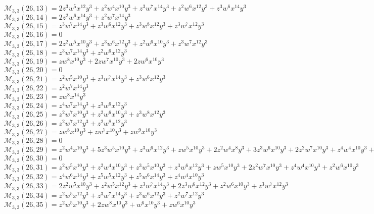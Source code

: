 $\mathcal{M}_{3,3}(26,13)=2z^3w^5x^{12}y^3+z^2w^4x^{10}y^3+z^3w^7x^{14}y^3+z^2w^6x^{12}y^3+z^3w^6x^{14}y^3$\\
$\mathcal{M}_{3,3}(26,14)=2z^2w^6x^{14}y^3+z^2w^7x^{14}y^3$\\
$\mathcal{M}_{3,3}(26,15)=z^3w^7x^{14}y^3+z^3w^6x^{12}y^3+z^3w^8x^{12}y^3+z^3w^7x^{12}y^3$\\
$\mathcal{M}_{3,3}(26,16)=0$\\
$\mathcal{M}_{3,3}(26,17)=2z^2w^5x^{10}y^3+z^3w^6x^{12}y^3+z^2w^6x^{10}y^3+z^3w^7x^{12}y^3$\\
$\mathcal{M}_{3,3}(26,18)=z^3w^7x^{14}y^3+z^2w^6x^{12}y^3$\\
$\mathcal{M}_{3,3}(26,19)=zw^8x^{10}y^3+2zw^7x^{10}y^3+2zw^6x^{10}y^3$\\
$\mathcal{M}_{3,3}(26,20)=0$\\
$\mathcal{M}_{3,3}(26,21)=z^2w^5x^{10}y^3+z^3w^7x^{14}y^3+z^3w^6x^{12}y^3$\\
$\mathcal{M}_{3,3}(26,22)=z^2w^7x^{14}y^3$\\
$\mathcal{M}_{3,3}(26,23)=zw^8x^{14}y^3$\\
$\mathcal{M}_{3,3}(26,24)=z^4w^7x^{14}y^3+z^3w^6x^{12}y^3$\\
$\mathcal{M}_{3,3}(26,25)=z^2w^7x^{10}y^3+z^2w^6x^{10}y^3+z^3w^8x^{12}y^3$\\
$\mathcal{M}_{3,3}(26,26)=z^2w^7x^{12}y^3+z^2w^8x^{12}y^3$\\
$\mathcal{M}_{3,3}(26,27)=zw^8x^{10}y^3+zw^7x^{10}y^3+zw^9x^{10}y^3$\\
$\mathcal{M}_{3,3}(26,28)=0$\\
$\mathcal{M}_{3,3}(26,29)=z^2w^4x^{10}y^3+5z^3w^5x^{10}y^3+z^3w^6x^{12}y^3+zw^5x^{10}y^3+2z^2w^4x^8y^3+3z^3w^6x^{10}y^3+2z^2w^7x^{10}y^3+z^4w^4x^{10}y^3+z^2w^5x^8y^3$\\
$\mathcal{M}_{3,3}(26,30)=0$\\
$\mathcal{M}_{3,3}(26,31)=z^2w^5x^{10}y^3+z^2w^4x^{10}y^3+z^3w^5x^{10}y^3+z^3w^6x^{12}y^3+zw^5x^{10}y^3+2z^2w^7x^{10}y^3+z^4w^4x^{10}y^3+z^2w^6x^{10}y^3$\\
$\mathcal{M}_{3,3}(26,32)=z^4w^6x^{14}y^3+z^5w^5x^{12}y^3+z^5w^6x^{14}y^3+z^4w^4x^{10}y^3$\\
$\mathcal{M}_{3,3}(26,33)=2z^2w^5x^{10}y^3+z^2w^5x^{12}y^3+z^3w^7x^{14}y^3+2z^3w^6x^{12}y^3+z^2w^6x^{10}y^3+z^3w^7x^{12}y^3$\\
$\mathcal{M}_{3,3}(26,34)=z^2w^5x^{12}y^3+z^3w^7x^{14}y^3+z^3w^6x^{12}y^3+z^2w^7x^{12}y^3$\\
$\mathcal{M}_{3,3}(26,35)=z^2w^5x^{10}y^3+2zw^8x^{10}y^3+w^6x^{10}y^3+zw^6x^{10}y^3$\\
